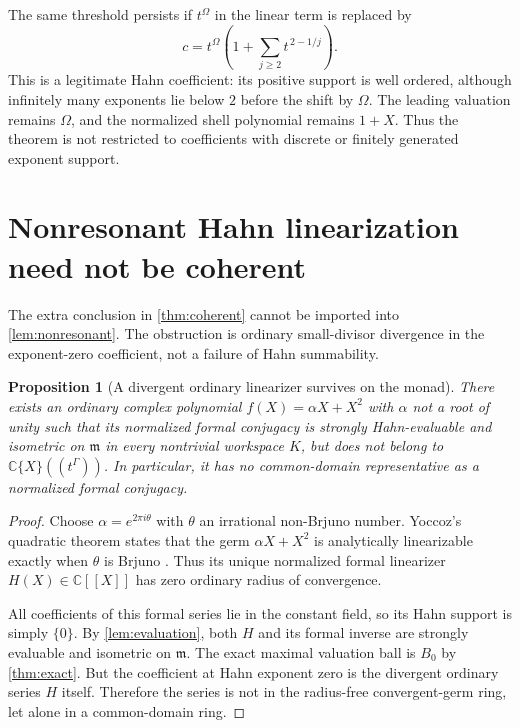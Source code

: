 \documentclass[11pt,letterpaper]{article}
\numberwithin{equation}{section}
\theoremstyle{plain}
\newtheorem{proposition}[theorem]{Proposition}
\theoremstyle{definition}
\theoremstyle{remark}
\newcommand{\C}{\mathbb C}
\newcommand{\mm}{\mathfrak m}
\begin{document}
The same threshold persists if $t^\Omega$ in the linear term is replaced by
\[
 c=t^\Omega\left(1+\sum_{j\ge2}t^{\,2-1/j}\right).
\]
This is a legitimate Hahn coefficient: its positive support is well ordered,
although infinitely many exponents lie below $2$ before the shift by
$\Omega$. The leading valuation remains $\Omega$, and the normalized shell
polynomial remains $1+X$. Thus the theorem is not restricted to coefficients
with discrete or finitely generated exponent support.

\section{Nonresonant Hahn linearization need not be coherent}\label{sec:noncoherent}

The extra conclusion in \cref{thm:coherent} cannot be imported into
\cref{lem:nonresonant}. The obstruction is ordinary small-divisor divergence
in the exponent-zero coefficient, not a failure of Hahn summability.

\begin{proposition}[A divergent ordinary linearizer survives on the monad]
\label{prop:noncoherent}
There exists an ordinary complex polynomial $f(X)=\alpha X+X^2$ with
$\alpha$ not a root of unity such that its normalized formal conjugacy is
strongly Hahn-evaluable and isometric on $\mm$ in every nontrivial workspace
$K$, but does not belong to $\C\{X\}((t^\Gamma))$. In particular, it has
no common-domain representative as a normalized formal conjugacy.
\end{proposition}

\begin{proof}
Choose $\alpha=e^{2\pi i\theta}$ with $\theta$ an irrational non-Brjuno
number. Yoccoz's quadratic theorem states that the germ
$\alpha X+X^2$ is analytically linearizable exactly when $\theta$ is Brjuno
\cite{yoccoz}. Thus its unique normalized formal linearizer
$H(X)\in\C[[X]]$ has zero ordinary radius of convergence.

All coefficients of this formal series lie in the constant field, so its
Hahn support is simply $\{0\}$. By \cref{lem:evaluation}, both $H$ and
its formal inverse are strongly evaluable and isometric on $\mm$.
The exact maximal valuation ball is $B_0$ by \cref{thm:exact}.
But the coefficient at Hahn exponent zero is the divergent ordinary series
$H$ itself. Therefore the series is not in the radius-free convergent-germ
ring, let alone in a common-domain ring.
\end{proof}
\end{document}
